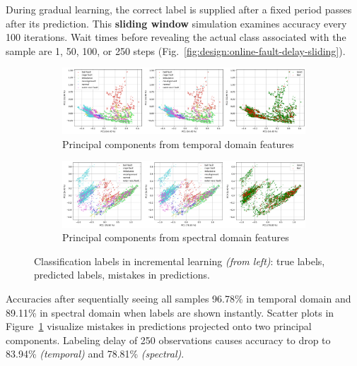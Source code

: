 During gradual learning, the correct label is supplied after a fixed period passes after its prediction. This \textbf{sliding window} simulation examines accuracy every 100 iterations. Wait times before revealing the actual class associated with the sample are 1, 50, 100, or 250 steps (Fig.~\ref{fig:design:online-fault-delay-sliding}). 


\begin{figure}[ht]
    \centering
    \begin{subfigure}[b]{\textwidth}
        \includegraphics[width=\textwidth]{assets/design/pca-scatter-online-fault-temporal.png}
        \caption{Principal components from temporal domain features}
    \end{subfigure}
    \hfill
    \begin{subfigure}[b]{\textwidth}
        \includegraphics[width=\textwidth]{assets/design/pca-scatter-online-fault-spectral.png}
        \caption{Principal components from spectral domain features}
    \end{subfigure}
    \caption{Classification labels in incremental learning \emph{(from left)}: true labels, predicted labels, mistakes in predictions.}
    \label{fig:design:scatter-plot-online}
\end{figure}

Accuracies after sequentially seeing all samples 96.78\% in temporal domain and 89.11\% in spectral domain when labels are shown instantly. Scatter plots in Figure~\ref{fig:design:scatter-plot-online} visualize mistakes in predictions projected onto two principal components. Labeling delay of 250 observations causes accuracy to drop to 83.94\% \emph{(temporal)} and 78.81\% \emph{(spectral)}.
	
